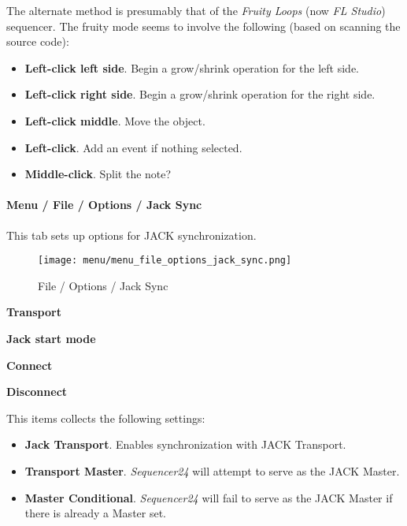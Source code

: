    The alternate method is presumably that of the \textsl{Fruity Loops}
   (now \textsl{FL Studio}) sequencer.  The fruity mode seems to involve the
   following (based on scanning the source code):
   
   \begin{itemize}
      \item \textbf{Left-click left side}.
         Begin a grow/shrink operation for the left side.
      \item \textbf{Left-click right side}.
         Begin a grow/shrink operation for the right side.
      \item \textbf{Left-click middle}.
         Move the object.
      \item \textbf{Left-click}.
         Add an event if nothing selected.
      \item \textbf{Middle-click}.
         Split the note?
   \end{itemize}

\paragraph{Menu / File / Options / Jack Sync }
\label{paragraph:seq24_menu_file_options_jack_sync}

   This tab sets up options for JACK synchronization.

\begin{figure}[H]
   \centering 
   \texttt{[image: menu/menu\_file\_options\_jack\_sync.png]}
   \caption{File / Options / Jack Sync}
   \label{fig:seq24_menu_file_options_jack_sync}
\end{figure}

   \begin{enumber}
      \item \textbf{Transport}
      \item \textbf{Jack start mode}
      \item \textbf{Connect}
      \item \textbf{Disconnect}
   \end{enumber}

   \setcounter{ItemCounter}{0}      %

   This items collects the following settings:

   \begin{itemize}
      \item \textbf{Jack Transport}.
         Enables synchronization with JACK Transport.
      \item \textbf{Transport Master}.
         \textsl{Sequencer24} will attempt to serve as the JACK Master.
      \item \textbf{Master Conditional}.
         \textsl{Sequencer24} will fail to serve as the JACK Master if there is
         already a Master set.
   \end{itemize}

